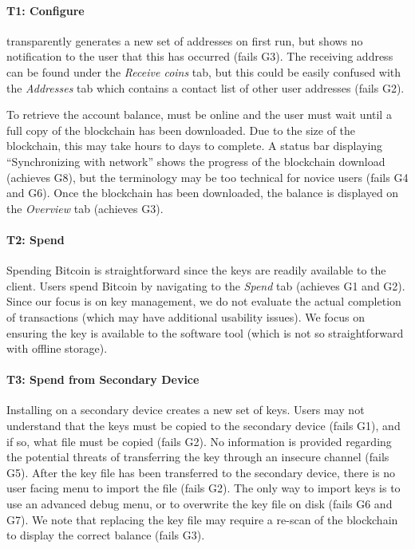 \paragraph{T1: Configure} \bitcoinclient transparently generates a new set of addresses on first run, but shows no notification to the user that this has occurred (fails G3). The receiving address can be found under the \emph{Receive coins} tab, but this could be easily confused with the \emph{Addresses} tab which contains a contact list of other user addresses (fails G2). 

To retrieve the account balance, \bitcoinclient must be online and the user must wait until a full copy of the blockchain has been downloaded. Due to the size of the blockchain, this may take hours to days to complete. A status bar displaying ``Synchronizing with network'' shows the progress of the blockchain download (achieves G8), but the terminology may be too technical for novice users (fails G4 and G6). Once the blockchain has been downloaded, the balance is displayed on the \emph{Overview} tab (achieves G3). 

\paragraph{T2: Spend} Spending Bitcoin is straightforward since the keys are readily available to the \bitcoinclient client. Users spend Bitcoin by navigating to the \emph{Spend} tab (achieves G1 and G2). Since our focus is on key management, we do not evaluate the actual completion of transactions (which may have additional usability issues). We focus on ensuring the key is available to the software tool (which is not so straightforward with \eg offline storage). 

\paragraph{T3: Spend from Secondary Device} Installing \bitcoinclient on a secondary device creates a new set of keys. Users may not understand that the keys must be copied to the secondary device (fails G1), and if so, what file must be copied (fails G2). No information is provided regarding the potential threats of transferring the key through an insecure channel (fails G5). After the key file has been transferred to the secondary device, there is no user facing menu to import the file (fails G2). The only way to import keys is to use an advanced debug menu, or to overwrite the key file on disk (fails G6 and G7). We note that replacing the key file may require  a re-scan of the blockchain to display the correct balance (fails G3).


